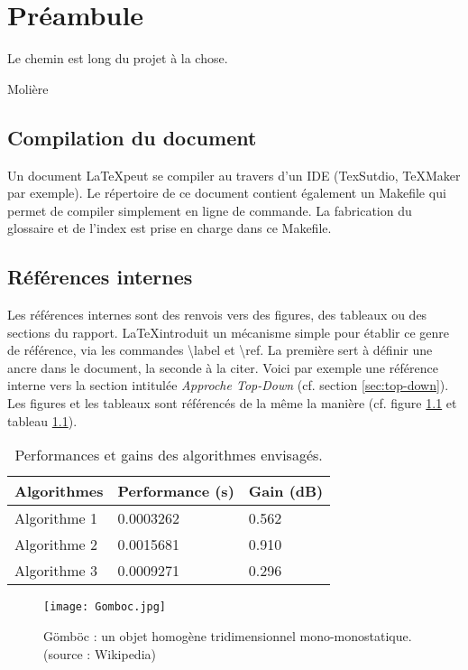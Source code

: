 \chapter{Préambule}
\epigraph{Le chemin est long du projet à la chose.}{Molière}

\section{Compilation du document}

Un document \LaTeX peut se compiler au travers d'un IDE (TexSutdio, TeXMaker par exemple).
Le répertoire de ce document contient également un Makefile qui permet de compiler simplement en ligne de commande. 
La fabrication du glossaire et de l'index est prise en charge dans ce Makefile. 

\section{Références internes}

Les références internes sont des renvois vers des figures, des tableaux ou des sections du rapport.
\LaTeX introduit un mécanisme simple pour établir ce genre de référence, via les commandes  \textsf{\textbackslash label} et \textsf{\textbackslash ref}. 
La première sert à définir une ancre dans le document, la seconde à la citer.
Voici par exemple une référence interne vers la section intitulée \textit{Approche Top-Down} (cf. section  \ref{sec:top-down}).
Les figures  et les tableaux  sont référencés de la même la manière (cf. figure \ref{fig:gomboc} et tableau \ref{tab:exemple}).  

\begin{table}[h]
\centering
\begin{tabular}{lll}
\toprule
\textbf{Algorithmes} & \textbf{Performance (s)} & \textbf{Gain (dB)}\\
\midrule
Algorithme 1 & 0.0003262 & 0.562 \\
Algorithme 2 & 0.0015681 & 0.910 \\
Algorithme 3 & 0.0009271 & 0.296 \\
\bottomrule
\end{tabular}
\caption{\label{tab:exemple}Performances et gains des algorithmes envisagés.}
\end{table}

\begin{figure}[h]
\centering\texttt{[image: Gomboc.jpg]}
\caption{\label{fig:gomboc}Gömböc : un objet homogène tridimensionnel mono-monostatique. (source : Wikipedia)}
\end{figure}


